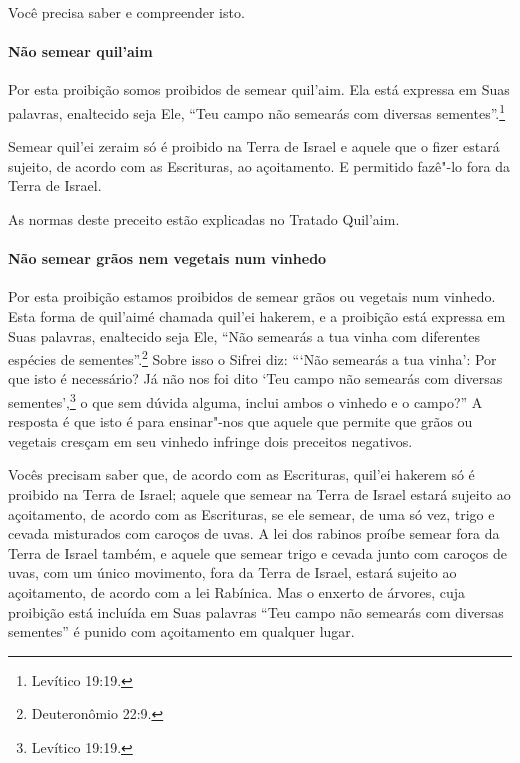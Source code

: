 \begin{multicols}{2}
Você precisa saber e compreender isto.

\paragraph{Não semear quil'aim\starr}

Por esta proibição somos proibidos de semear
quil'aim\starr. Ela está expressa em Suas palavras,
enaltecido seja Ele, ``Teu campo não semearás com diversas sementes''.\footnote{Levítico 19:19.}

Semear quil'ei zeraim\starr{} só é proibido na Terra de Israel e aquele que
o fizer estará sujeito, de acordo com as Escrituras, ao açoitamento. E
permitido fazê"-lo fora da Terra de Israel.

As normas deste preceito estão explicadas no Tratado Quil'aim\starr.

\paragraph{Não semear grãos nem vegetais num vinhedo}

Por esta proibição estamos proibidos de semear grãos ou vegetais num
vinhedo. Esta forma de quil'aim\starr é chamada quil'ei hakerem\starr, e a
proibição está expressa em Suas palavras, enaltecido seja Ele, ``Não
semearás a tua vinha com diferentes espécies de sementes''.\footnote{Deuteronômio
22:9.} Sobre isso o Sifrei\starr{} diz: ```Não semearás a tua vinha': Por que
isto é necessário? Já não nos foi dito `Teu campo não semearás com
diversas sementes',\footnote{Levítico 19:19.} o que sem dúvida alguma, inclui
ambos o vinhedo e o campo?'' A resposta é que isto é para ensinar"-nos
que aquele que permite que grãos ou vegetais cresçam em seu vinhedo
infringe dois preceitos negativos.

Vocês precisam saber que, de acordo com as Escrituras, quil'ei hakerem\starr{} só é proibido na Terra de Israel; aquele que semear na Terra de
Israel estará sujeito ao açoitamento, de acordo com as Escrituras, se
ele semear, de uma só vez, trigo e cevada misturados com caroços de
uvas. A lei dos rabinos proíbe semear fora da Terra de Israel também, e
aquele que semear trigo e cevada junto com caroços de uvas, com um
único movimento, fora da Terra de Israel, estará sujeito ao açoitamento,
de acordo com a lei Rabínica. Mas o enxerto de árvores, cuja proibição
está incluída em Suas palavras ``Teu campo não semearás com diversas
sementes'' é punido com açoitamento em qualquer lugar.


\end{multicols}
